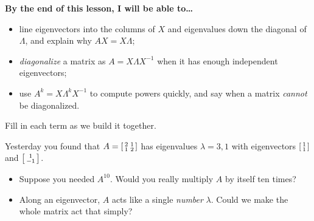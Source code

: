 \documentclass[10pt]{article}
\begin{document}
\namedateperiod

\vspace{0.12in}

\begin{objectivebox}
\textbf{By the end of this lesson, I will be able to\dots}
\begin{itemize}\setlength{\itemsep}{2pt}
  \item line eigenvectors into the columns of $X$ and eigenvalues down the diagonal of $\Lambda$, and explain why $AX=X\Lambda$;
  \item \emph{diagonalize} a matrix as $A=X\Lambda X^{-1}$ when it has enough independent eigenvectors;
  \item use $A^k=X\Lambda^k X^{-1}$ to compute powers quickly, and say when a matrix \emph{cannot} be diagonalized.
\end{itemize}
\end{objectivebox}

\vspace{0.06in}

\begin{vocabbox}
\small
Fill in each term as we build it together.
\vspace{2pt}
\end{vocabbox}

\begin{hookbox}
Yesterday you found that $A=\begin{bsmallmatrix} 2 & 1\\ 1 & 2 \end{bsmallmatrix}$ has eigenvalues
$\lambda=3,1$ with eigenvectors $\begin{bsmallmatrix}1\\1\end{bsmallmatrix}$ and $\begin{bsmallmatrix}1\\-1\end{bsmallmatrix}$.
\begin{itemize}\setlength{\itemsep}{1pt}
  \item Suppose you needed $A^{10}$. Would you really multiply $A$ by itself ten times? \writeline
  \item Along an eigenvector, $A$ acts like a single \emph{number} $\lambda$. Could we make the whole matrix act that simply? \writeline
\end{itemize}
\end{hookbox}
\end{document}
